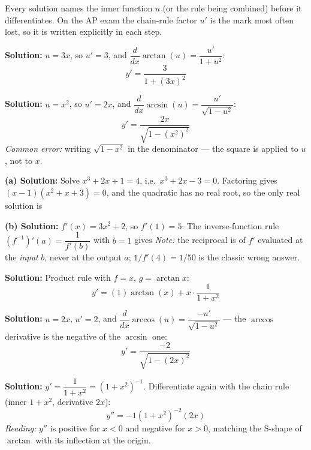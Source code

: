 \documentclass[12pt]{article}
\begin{document}


\noindent\small Every solution names the inner function $u$ (or the rule being combined) before it
differentiates. On the AP exam the chain-rule factor $u'$ is the mark most often lost, so it is
written explicitly in each step.\normalsize

\textbf{Solution:} $u = 3x$, so $u' = 3$, and
$\dfrac{d}{dx}\arctan(u) = \dfrac{u'}{1 + u^{2}}$:
\[ y' = \frac{3}{1 + (3x)^{2}} \]

\textbf{Solution:} $u = x^{2}$, so $u' = 2x$, and
$\dfrac{d}{dx}\arcsin(u) = \dfrac{u'}{\sqrt{1 - u^{2}}}$:
\[ y' = \frac{2x}{\sqrt{1 - (x^{2})^{2}}} \]
\emph{Common error:} writing $\sqrt{1 - x^{2}}$ in the denominator --- the square is applied to
$u$, not to $x$.

\textbf{(a) Solution:} Solve $x^{3} + 2x + 1 = 4$, i.e.\ $x^{3} + 2x - 3 = 0$. Factoring gives
$(x - 1)(x^{2} + x + 3) = 0$, and the quadratic has no real root, so the only real solution is

\textbf{(b) Solution:} $f'(x) = 3x^{2} + 2$, so $f'(1) = 5$. The inverse-function rule
$\left(f^{-1}\right)'(a) = \dfrac{1}{f'(b)}$ with $b = 1$ gives
\emph{Note:} the reciprocal is of $f'$ evaluated at the \emph{input} $b$, never at the output $a$;
$1/f'(4) = 1/50$ is the classic wrong answer.

\textbf{Solution:} Product rule with $f = x$, $g = \arctan x$:
\[ y' = (1)\arctan(x) + x \cdot \frac{1}{1 + x^{2}} \]

\textbf{Solution:} $u = 2x$, $u' = 2$, and
$\dfrac{d}{dx}\arccos(u) = \dfrac{-u'}{\sqrt{1 - u^{2}}}$ --- the $\arccos$ derivative is the
negative of the $\arcsin$ one:
\[ y' = \frac{-2}{\sqrt{1 - (2x)^{2}}} \]

\textbf{Solution:} $y' = \dfrac{1}{1 + x^{2}} = (1 + x^{2})^{-1}$. Differentiate again with the
chain rule (inner $1 + x^{2}$, derivative $2x$):
\[ y'' = -1(1 + x^{2})^{-2}(2x) \]
\emph{Reading:} $y''$ is positive for $x < 0$ and negative for $x > 0$, matching the S-shape of
$\arctan$ with its inflection at the origin.
\end{document}
